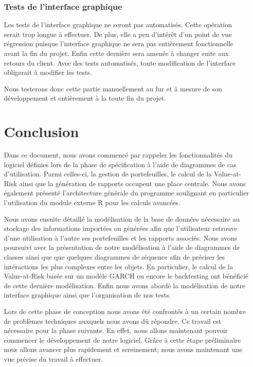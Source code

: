 \documentclass[a4paper]{report}
\begin{document}
\subsection{Tests de l'interface graphique}

Les tests de l'interface graphique ne seront pas automatisés.
Cette opération serait trop longue à effectuer.
De plus, elle a peu d'intérêt d'un point de vue régression puisque l'interface graphique ne sera pas entièrement fonctionnelle avant la fin du projet.
Enfin cette dernière sera amenée à changer suite aux retours du client.
Avec des tests automatisés, toute modification de l'interface obligerait à modifier les tests.

Nous testerons donc cette partie manuellement au fur et à mesure de son développement et entièrement à la toute fin du projet.


\chapter*{Conclusion}

Dans ce document, nous avons commencé par rappeler les fonctionnalités du logiciel définies lors de la phase de spécification à l'aide de  diagrammes de cas d'utilisation.
Parmi celles-ci, la gestion de portefeuilles, le calcul de la Value-at-Risk ainsi que la génération de rapports occupent une place centrale.
Nous avons également présenté l'architecture générale du programme soulignant en particulier l'utilisation du module externe R pour les calculs avancées.

Nous avons ensuite détaillé la modélisation de la base de données nécessaire au stockage des informations importées ou générées afin que l'utilisateur retrouve d'une utilisation à l'autre ses portefeuilles et les rapports associés.
Nous avons poursuivi avec la présentation de notre modélisation à l'aide de diagrammes de classes ainsi que que quelques diagrammes de séquence afin de préciser les intéractions les plus complexes entre les objets.
En particulier, le calcul de la Value-at-Risk basée sur un modèle GARCH ou encore le backtesting ont bénéficié de cette dernière modélisation.
Enfin nous avons abordé la modélisation de notre interface graphique ainsi que l'organisation de nos tests.

Lors de cette phase de conception nous avons été confrontés à un certain nombre de problèmes techniques auxquels nous avons dû répondre.
Ce travail est nécessaire pour la phase suivante.
En effet, nous allons maintenant pouvoir commencer le développement de notre logiciel.
Grâce à cette étape préliminaire nous allons avancer plus rapidement et sereinement; nous avons maintenant une vue précise du travail à effectuer.
\end{document}
